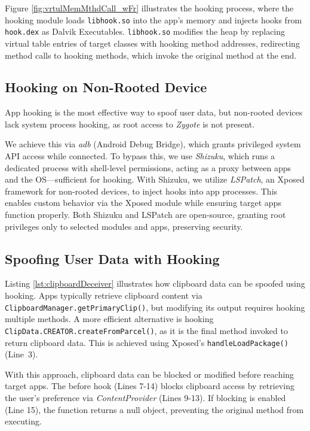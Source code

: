 Figure \ref{fig:vrtulMemMthdCall_wFr} illustrates the hooking process, where the hooking module loads \texttt{libhook.so} into the app's memory and injects hooks from \texttt{hook.dex} as Dalvik Executables. \texttt{libhook.so} modifies the heap by replacing virtual table entries of target classes with hooking method addresses, redirecting method calls to hooking methods, which invoke the original method at the end.


\subsection{Hooking on Non-Rooted Device}

App hooking is the most effective way to spoof user data, but non-rooted devices lack system process hooking, as root access to \textit{Zygote} is not present.

We achieve this via \textit{adb} (Android Debug Bridge), which grants privileged system API access while connected. To bypass this, we use \textit{Shizuku}, which runs a dedicated process with shell-level permissions, acting as a proxy between apps and the OS—sufficient for hooking. With Shizuku, we utilize \textit{LSPatch}, an Xposed framework for non-rooted devices, to inject hooks into app processes. This enables custom behavior via the Xposed module while ensuring target apps function properly. Both Shizuku and LSPatch are open-source, granting root privileges only to selected modules and apps, preserving security.

\subsection{Spoofing User Data with Hooking}

Listing \ref{lst:clipboardDeceiver} illustrates how clipboard data can be spoofed using hooking. Apps typically retrieve clipboard content via \texttt{ClipboardManager.getPrimaryClip()}, but modifying its output requires hooking multiple methods. A more efficient alternative is hooking \texttt{ClipData.CREATOR.createFromParcel()}, as it is the final method invoked to return clipboard data. This is achieved using Xposed's \texttt{handleLoadPackage()} (Line~3).

With this approach, clipboard data can be blocked or modified before reaching target apps. The before hook (Lines 7-14) blocks clipboard access by retrieving the user's preference via \textit{ContentProvider} (Lines 9-13). If blocking is enabled (Line 15), the function returns a null object, preventing the original method from executing.

